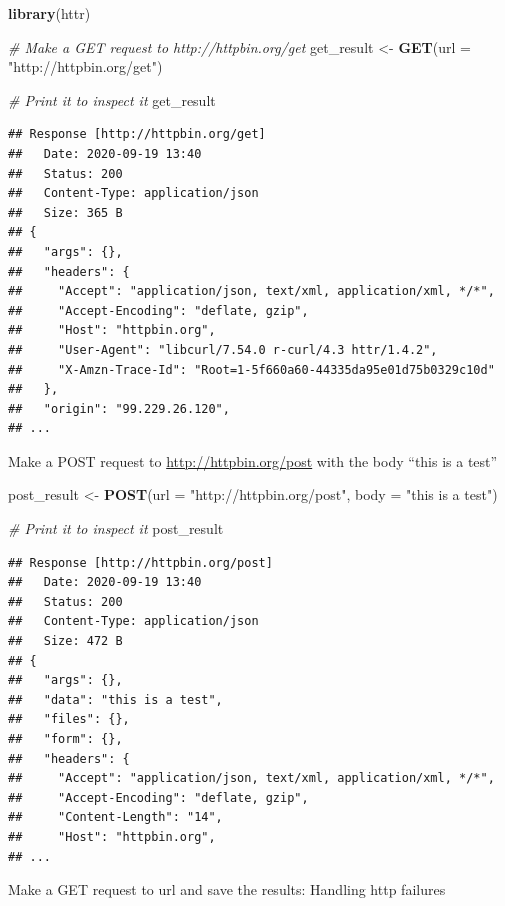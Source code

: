 \documentclass[]{book}
\newenvironment{Shaded}{\begin{snugshade}}{\end{snugshade}}
\newcommand{\CommentTok}[1]{\textcolor[rgb]{0.56,0.35,0.01}{\textit{#1}}}
\newcommand{\DataTypeTok}[1]{\textcolor[rgb]{0.13,0.29,0.53}{#1}}
\newcommand{\KeywordTok}[1]{\textcolor[rgb]{0.13,0.29,0.53}{\textbf{#1}}}
\newcommand{\NormalTok}[1]{#1}
\newcommand{\StringTok}[1]{\textcolor[rgb]{0.31,0.60,0.02}{#1}}
\begin{document}
\begin{Shaded}
\begin{Highlighting}[]
\KeywordTok{library}\NormalTok{(httr)}

\CommentTok{# Make a GET request to http://httpbin.org/get}
\NormalTok{get_result <-}\StringTok{ }\KeywordTok{GET}\NormalTok{(}\DataTypeTok{url =} \StringTok{"http://httpbin.org/get"}\NormalTok{)}

\CommentTok{# Print it to inspect it}
\NormalTok{get_result}
\end{Highlighting}
\end{Shaded}

\begin{verbatim}
## Response [http://httpbin.org/get]
##   Date: 2020-09-19 13:40
##   Status: 200
##   Content-Type: application/json
##   Size: 365 B
## {
##   "args": {}, 
##   "headers": {
##     "Accept": "application/json, text/xml, application/xml, */*", 
##     "Accept-Encoding": "deflate, gzip", 
##     "Host": "httpbin.org", 
##     "User-Agent": "libcurl/7.54.0 r-curl/4.3 httr/1.4.2", 
##     "X-Amzn-Trace-Id": "Root=1-5f660a60-44335da95e01d75b0329c10d"
##   }, 
##   "origin": "99.229.26.120", 
## ...
\end{verbatim}

Make a POST request to \url{http://httpbin.org/post} with the body ``this is a test''

\begin{Shaded}
\begin{Highlighting}[]
\NormalTok{post_result <-}\StringTok{ }\KeywordTok{POST}\NormalTok{(}\DataTypeTok{url =} \StringTok{"http://httpbin.org/post"}\NormalTok{, }\DataTypeTok{body =} \StringTok{"this is a test"}\NormalTok{)}

\CommentTok{# Print it to inspect it}
\NormalTok{post_result}
\end{Highlighting}
\end{Shaded}

\begin{verbatim}
## Response [http://httpbin.org/post]
##   Date: 2020-09-19 13:40
##   Status: 200
##   Content-Type: application/json
##   Size: 472 B
## {
##   "args": {}, 
##   "data": "this is a test", 
##   "files": {}, 
##   "form": {}, 
##   "headers": {
##     "Accept": "application/json, text/xml, application/xml, */*", 
##     "Accept-Encoding": "deflate, gzip", 
##     "Content-Length": "14", 
##     "Host": "httpbin.org", 
## ...
\end{verbatim}

Make a GET request to url and save the results:
Handling http failures
\end{document}
